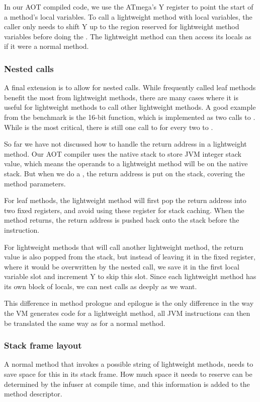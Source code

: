 In our AOT compiled code, we use the ATmega's Y register to point the start of a method's local variables. To call a lightweight method with local variables, the caller only needs to shift Y up to the region reserved for lightweight method variables before doing the . The lightweight method can then access its locals as if it were a normal method.

\subsubsection{Nested calls}
A final extension is to allow for nested calls. While frequently called leaf methods benefit the most from lightweight methods, there are many cases where it is useful for lightweight methods to call other lightweight methods. A good example from the  benchmark is the 16-bit  function, which is implemented as two calls to . While  is the most critical, there is still one call to  for every two to .

So far we have not discussed how to handle the return address in a lightweight method. Our AOT compiler uses the native stack to store JVM integer stack value, which means the operands to a lightweight method will be on the native stack. But when we do a , the return address is put on the stack, covering the method parameters.

For leaf methods, the lightweight method will first pop the return address into two fixed registers, and avoid using these register for stack caching. When the method returns, the return address is pushed back onto the stack before the  instruction.

For lightweight methods that will call another lightweight method, the return value is also popped from the stack, but instead of leaving it in the fixed register, where it would be overwritten by the nested call, we save it in the first local variable slot and increment Y to skip this slot. Since each lightweight method has its own block of locals, we can nest calls as deeply as we want.

This difference in method prologue and epilogue is the only difference in the way the VM generates code for a lightweight method, all JVM instructions can then be translated the same way as for a normal method.

\subsubsection{Stack frame layout}
A normal method that invokes a possible string of lightweight methods, needs to save space for this in its stack frame. How much space it needs to reserve can be determined by the infuser at compile time, and this information is added to the method descriptor.

